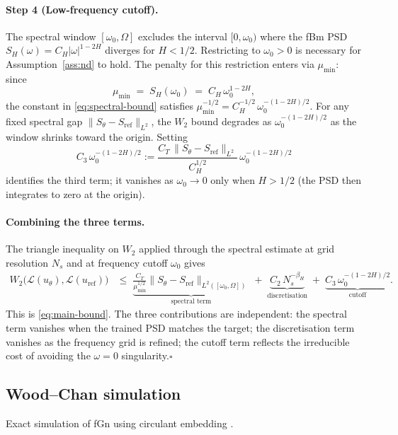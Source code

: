\documentclass[11pt,a4paper]{article}
\begin{document}
\paragraph{Step 4 (Low-frequency cutoff).}
The spectral window $[\omega_0,\Omega]$ excludes the interval $[0,\omega_0)$
where the fBm PSD $S_H(\omega) = C_H|\omega|^{1-2H}$ diverges for $H < 1/2$.
Restricting to $\omega_0 > 0$ is necessary for Assumption~\ref{ass:nd} to
hold. The penalty for this restriction enters via $\mu_{\min}$: since
\[
 \mu_{\min} \;=\; S_H(\omega_0) \;=\; C_H\,\omega_0^{1-2H},
\]
the constant in \eqref{eq:spectral-bound} satisfies
$\mu_{\min}^{-1/2} = C_H^{-1/2}\,\omega_0^{-(1-2H)/2}$.
For any fixed spectral gap $\|S_\theta-S_{\mathrm{ref}}\|_{L^2}$, the
$W_2$ bound degrades as $\omega_0^{-(1-2H)/2}$ as the window shrinks toward
the origin. Setting
\[
 C_3\,\omega_0^{-(1-2H)/2}
 := \frac{C_T\,\|S_\theta-S_{\mathrm{ref}}\|_{L^2}}{C_H^{1/2}}\,
   \omega_0^{-(1-2H)/2}
\]
identifies the third term; it vanishes as $\omega_0 \to 0$ only when
$H > 1/2$ (the PSD then integrates to zero at the origin).

\paragraph{Combining the three terms.}
The triangle inequality on $W_2$ applied through the spectral estimate at
grid resolution $N_s$ and at frequency cutoff $\omega_0$ gives
\begin{align*}
 W_2\!\bigl(\mathcal{L}(u_\theta),\mathcal{L}(u_{\mathrm{ref}})\bigr)
 &\leq\;
 \underbrace{\frac{C_T}{\mu_{\min}^{1/2}}
 \bigl\|S_\theta-S_{\mathrm{ref}}\bigr\|_{L^2([\omega_0,\Omega])}}_{\text{spectral term}}
 \;+\;
 \underbrace{C_2\,N_s^{-\beta_H}}_{\text{discretisation}}
 \;+\;
 \underbrace{C_3\,\omega_0^{-(1-2H)/2}}_{\text{cutoff}}.
\end{align*}
This is \eqref{eq:main-bound}. The three contributions are independent:
the spectral term vanishes when the trained PSD matches the target;
the discretisation term vanishes as the frequency grid is refined;
the cutoff term reflects the irreducible cost of avoiding the $\omega = 0$
singularity.\hfill$\square$

\subsection{Wood--Chan simulation}
\label{app:wood-chan}

Exact simulation of fGn using circulant embedding
\citep{wood1994simulation, dietrich1997fast}.
\end{document}

